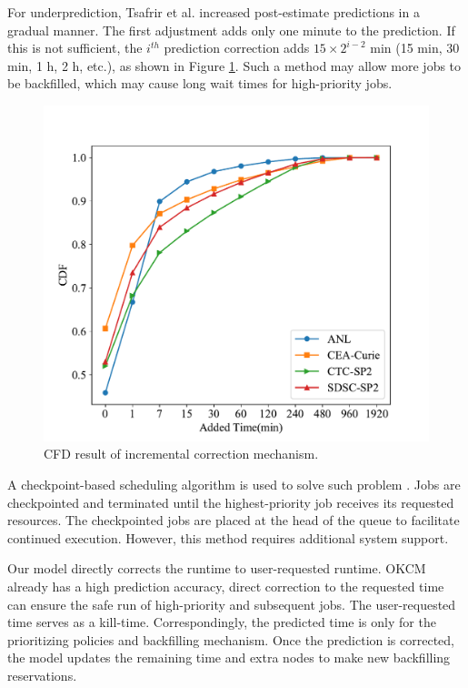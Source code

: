 \documentclass[a4paper,fleqn]{cas-sc}
\begin{document}
For underprediction, Tsafrir et al. \cite{6Tsafrir} increased post-estimate predictions in a gradual manner. The first adjustment adds only one minute to the prediction. If this is not sufficient, the $i^{th}$ prediction correction adds $15\times2^{i-2}$ min (15 min, 30 min, 1 h, 2 h, etc.), as shown in Figure \ref{FIG:4}. Such a method may allow more jobs to be backfilled, which may cause long wait times for high-priority jobs. 
\begin{figure}
	\centering
	\includegraphics[scale=.43]{figs/Fig4.pdf}
	\caption{CFD result of incremental correction mechanism.}
	\label{FIG:4}
\end{figure}

A checkpoint-based scheduling algorithm is used to solve such  problem \cite{20Check}. Jobs are checkpointed and terminated until the highest-priority job receives its requested resources. The checkpointed jobs are placed at the head of the queue to facilitate continued execution. However, this method requires additional system support.

Our model directly corrects the runtime to user-requested runtime.  OKCM already has a high prediction accuracy, direct correction to the requested time can ensure the safe run of high-priority and subsequent jobs. The user-requested time serves as a kill-time. Correspondingly, the predicted time is only for the prioritizing policies and backfilling mechanism. Once the prediction is corrected, the model updates the remaining time and extra nodes to make new backfilling reservations. 
\end{document}
